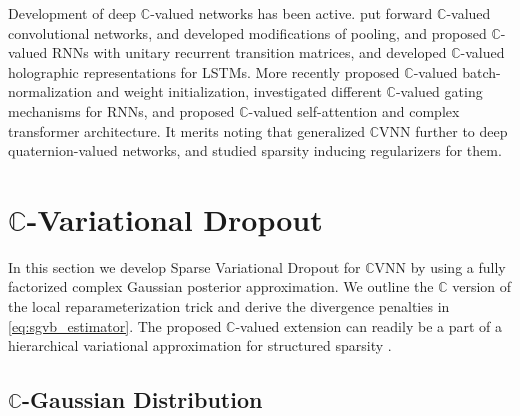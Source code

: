 \documentclass[a4paper,10pt,twocolumn]{article}
\newcommand{\cplx}{\mathbb{C}}
\newcommand{\important}[1]{\textbf{\!\colorbox{red}{#1}\!}}
\newcommand{\todo}[1]{{\color{blue} [TODO]} \important{#1}}
\begin{document}
Development of deep $\cplx$-valued networks has been active. \citet{haensch_complex-valued_2010}
put forward $\cplx$-valued convolutional networks, \citet{guberman_complex_2016} and
\citet{popa_complex-valued_2017} developed modifications of pooling, \citet{arjovsky_unitary_2016}
and \citet{wisdom_full-capacity_2016} proposed $\cplx$-valued RNNs with unitary recurrent
transition matrices, and \citet{danihelka_associative_2016} developed $\cplx$-valued
holographic representations for LSTMs. More recently \citet{trabelsi_deep_2018} proposed
$\cplx$-valued batch-normalization and weight initialization, \citet{wolter_complex_2018}
investigated different $\cplx$-valued gating mechanisms for RNNs, and \citet{yang_complex_2019}
proposed $\cplx$-valued self-attention and complex transformer architecture. It merits
noting that \citet{gaudet_deep_2018} generalized $\cplx$VNN further to deep quaternion-valued
networks, and \citet{vecchi_compressing_2020} studied sparsity inducing regularizers for
them.





\section{$\cplx$-Variational Dropout} %
\label{sec:c_variational_dropout}

In this section we develop Sparse Variational Dropout for $\cplx$VNN by using a fully
factorized complex Gaussian posterior approximation. We outline the $\cplx$ version of
the local reparameterization trick and derive the divergence penalties in \eqref{eq:sgvb_estimator}.
The proposed $\cplx$-valued extension can readily be a part of a hierarchical variational
approximation for structured sparsity \citep{louizos_bayesian_2017}.

\subsection{$\cplx$-Gaussian Distribution} %
\label{sub:c_gauss_and_local_rep}
\end{document}
